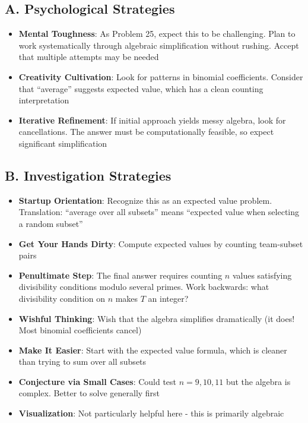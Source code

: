 \documentclass[]{article}
\begin{document}
	\begin{strategicbox}
		\subsection*{A. Psychological Strategies}
		\begin{itemize}[leftmargin=*]
			\item \textbf{Mental Toughness}: As Problem 25, expect this to be challenging. Plan to work systematically through algebraic simplification without rushing. Accept that multiple attempts may be needed
			\item \textbf{Creativity Cultivation}: Look for patterns in binomial coefficients. Consider that ``average'' suggests expected value, which has a clean counting interpretation
			\item \textbf{Iterative Refinement}: If initial approach yields messy algebra, look for cancellations. The answer must be computationally feasible, so expect significant simplification
		\end{itemize}
		
		\subsection*{B. Investigation Strategies}
		\begin{itemize}[leftmargin=*]
			\item \textbf{Startup Orientation}: Recognize this as an expected value problem. Translation: ``average over all subsets'' means ``expected value when selecting a random subset''
			\item \textbf{Get Your Hands Dirty}: Compute expected values by counting team-subset pairs
			\item \textbf{Penultimate Step}: The final answer requires counting $n$ values satisfying divisibility conditions modulo several primes. Work backwards: what divisibility condition on $n$ makes $T$ an integer?
			\item \textbf{Wishful Thinking}: Wish that the algebra simplifies dramatically (it does! Most binomial coefficients cancel)
			\item \textbf{Make It Easier}: Start with the expected value formula, which is cleaner than trying to sum over all subsets
			\item \textbf{Conjecture via Small Cases}: Could test $n = 9, 10, 11$ but the algebra is complex. Better to solve generally first
			\item \textbf{Visualization}: Not particularly helpful here - this is primarily algebraic
		\end{itemize}
		

\end{strategicbox}
\end{document}
